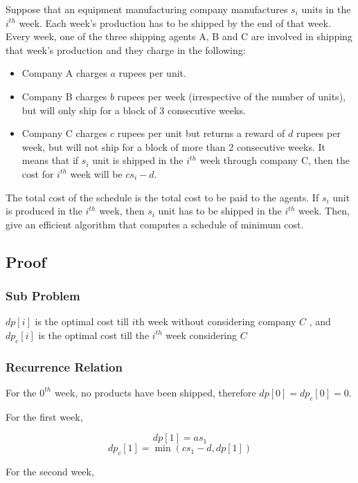 \documentclass[12pt]{article}
\newenvironment{statement}{\color[rgb]{1.00,0.00,0.50} {}}{}
\begin{document}
\begin{statement}
    Suppose that an equipment manufacturing company manufactures $s_i$ units in the
$i^{th}$ week. Each week’s production has to be shipped by the end of that week. Every week, one of the
three shipping agents A, B and C are involved in shipping that week’s production and they charge
in the following:
\begin{itemize}
    \item Company A charges $a$ rupees per unit.
    \item  Company B charges $b$ rupees per week (irrespective of the number of units), but will only ship for a block of 3 consecutive weeks.
    \item Company C charges $c$ rupees per unit but returns a reward of $d$ rupees per week, but will
not ship for a block of more than 2 consecutive weeks. It means that if $s_i$ unit is shipped in
the $i^{th}$ week through company C, then the cost for $i^{th}$ week will be $c s_i - d$.
\end{itemize}
The total cost of the schedule is the total cost to be paid to the agents. If $s_i$ unit is produced in the
$i^{th}$ week, then $s_i$ unit has to be shipped in the $i^{th}$ week. Then, give an efficient algorithm that
computes a schedule of minimum cost.
\end{statement}


\subsection{Proof}

\subsubsection{Sub Problem}

$dp[i]$ is the optimal cost till $i$th week without considering company $C$ , and $dp_c[i]$ is the optimal cost till the $i^{th}$ week considering $C$


\subsubsection{Recurrence Relation}
For the $0^{th}$ week, no products have been shipped, therefore 
$dp[0] = dp_c[0] = 0$.

For the first week, 

$$dp[1] = a s_1$$
$$dp_c[1] = \min(c s_1 - d, dp[1])$$

For the second week, 
\end{document}
